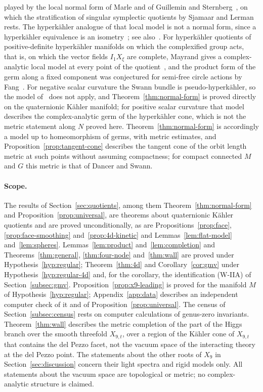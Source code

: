 played by the local normal form of Marle and of Guillemin and
Sternberg~\cite{Marle:1985,GuilleminSternberg:1984}, on which the stratification of singular symplectic
quotients by Sjamaar and Lerman~\cite{SjamaarLerman:1991} rests. The hyperk\"ahler analogue of that
local model is not a normal form, since a hyperk\"ahler equivalence is an
isometry~\cite[p.~149]{Swann:1997sing}; see
also~\cite[Sect.~1]{Mayrand:2022}. For hyperk\"ahler quotients of positive-definite hyperk\"ahler
manifolds on which the complexified group acts, that is, on which the vector fields $I_1X_\xi$ are
complete, Mayrand gives a complex-analytic local model at every point of the
quotient~\cite[Thm.~1.4]{Mayrand:2022}, and the product form of the germ along a fixed component was
conjectured for semi-free circle actions by Fang~\cite[Rem.~3.2]{Fang:2008}. For negative scalar
curvature the Swann bundle is pseudo-hyperk\"ahler, so the model of~\cite{Mayrand:2022} does not
apply, and Theorem~\ref{thm:normal-form} is proved directly on the quaternionic K\"ahler manifold;
for positive scalar curvature that model describes the complex-analytic germ of the hyperk\"ahler
cone, which is not the metric statement along $N$ proved here. Theorem~\ref{thm:normal-form} is
accordingly a model up to homeomorphism of germs, with metric estimates, and
Proposition~\ref{prop:tangent-cone} describes the tangent cone of the orbit length metric at such
points without assuming compactness; for compact connected $M$ and $G$ this metric is that of Dancer and Swann.

\paragraph{Scope.}
The results of Section~\ref{sec:quotients}, among them Theorem~\ref{thm:normal-form} and
Proposition~\ref{prop:universal}, are theorems about quaternionic K\"ahler quotients and are proved
unconditionally, as are Propositions~\ref{prop:face}, \ref{prop:face-smoothing}
and~\ref{prop:4d-kinetic} and Lemmas~\ref{lem:flat-model} and~\ref{lem:spheres}.
Lemmas~\ref{lem:product} and~\ref{lem:completion} and Theorems~\ref{thm:general},
\ref{thm:four-node} and~\ref{thm:wall} are proved under Hypothesis~\ref{hyp:regular};
Theorem~\ref{thm:4d} and Corollary~\ref{cor:gmv} under Hypothesis~\ref{hyp:regular-4d} and, for the
corollary, the identification (W-IIA) of Section~\ref{subsec:gmv}. Proposition~\ref{prop:x9-leading} is proved for the manifold $M$ of Hypothesis~\ref{hyp:regular};
Appendix~\ref{app:data} describes an independent computer check of it and of
Proposition~\ref{prop:universal}. The
census of Section~\ref{subsec:census} rests on computer calculations of genus-zero invariants. Theorem~\ref{thm:wall} describes the metric completion of the
part of the Higgs branch over the smooth threefold $X_{9,t}$, over a region of the K\"ahler cone of $X_{9,t}$ that contains the del
Pezzo facet, not the vacuum space of the interacting theory at the del Pezzo point. The
statements about the other roots of $X_9$ in Section~\ref{sec:discussion} concern their light
spectra and rigid models only. All statements about the vacuum space are topological or metric;
no complex-analytic structure is claimed.

